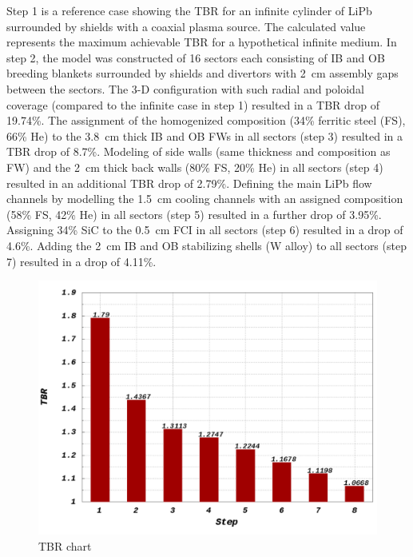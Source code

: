 \documentclass[12pt, letterpaper]{elsarticle}
\begin{document}
Step 1 is a reference case showing the TBR for an infinite cylinder of LiPb surrounded by shields with a coaxial plasma source. The calculated value represents the maximum achievable TBR for a hypothetical infinite medium. In step 2, the model was constructed of 16 sectors each consisting of IB and OB breeding blankets surrounded by shields and divertors with \SI{2}{cm} assembly gaps between the sectors. The 3-D configuration with such radial and poloidal coverage (compared to the infinite case in step 1) resulted in a TBR drop of 19.74\%. The assignment of the homogenized composition (34\% ferritic steel (FS), 66\% He) to the \SI{3.8}{cm} thick IB and OB FWs in all sectors (step 3) resulted in a TBR drop of 8.7\%. Modeling of side walls (same thickness and composition as FW) and the \SI{2}{cm} thick back walls (80\% FS, 20\% He) in all sectors (step 4) resulted in an additional TBR drop of 2.79\%. Defining the main LiPb flow channels by modelling the \SI{1.5}{cm} cooling channels with an assigned composition (58\% FS, 42\% He) in all sectors (step 5) resulted in a further drop of 3.95\%. Assigning 34\% SiC to the \SI{0.5}{cm} FCI in all sectors (step 6) resulted in a drop of 4.6\%. Adding the \SI{2}{cm} IB and OB stabilizing shells (W alloy) to all sectors (step 7) resulted in a drop of 4.11\%.
\begin{figure}[h!]
  \centering
  \includegraphics[scale=0.3]{../plots/TBR_chart.png}
  \caption{TBR chart}
  \label{fig:TBR chart}
\end{figure}
\end{document}
